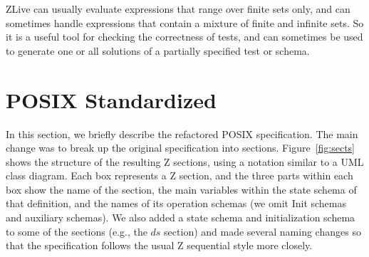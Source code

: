 \documentclass{llncs}
\begin{document}
ZLive can usually evaluate expressions that range over finite sets
only, and can sometimes handle expressions that contain a mixture of
finite and infinite sets.  So it is a useful tool for checking the
correctness of tests, and can sometimes be used to generate one
or all solutions of a partially specified test or schema.


\section{POSIX Standardized}\label{sect:posix}

In this section, we briefly describe the refactored POSIX specification.
The main change was to break up the original specification into sections.
Figure~\ref{fig:sects} shows the structure of the resulting Z
sections, using a notation similar to a UML class diagram.  Each box
represents a Z section, and the three parts within each box show the
name of the section, the main variables within the state schema of
that definition, and the names of its operation schemas (we omit Init
schemas and auxiliary schemas).  We also added a state schema and
initialization schema to some of the sections (e.g., the $ds$ section)
and made several naming changes so that the specification follows the
usual Z sequential style more closely.
\end{document}

